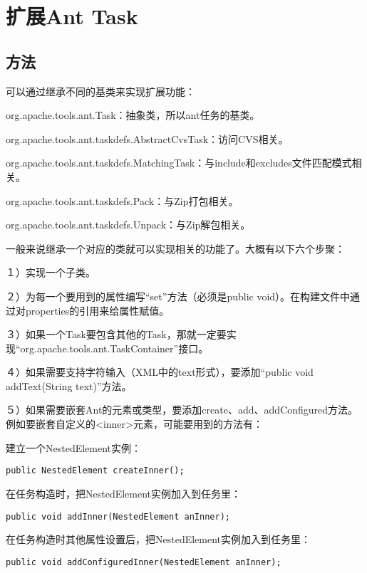 \section{扩展Ant Task}

\subsection{方法}

可以通过继承不同的基类来实现扩展功能：

org.apache.tools.ant.Task：抽象类，所以ant任务的基类。

org.apache.tools.ant.taskdefs.AbstractCvsTask：访问CVS相关。

org.apache.tools.ant.taskdefs.MatchingTask：与include和excludes文件匹配模式相关。

org.apache.tools.ant.taskdefs.Pack：与Zip打包相关。

org.apache.tools.ant.taskdefs.Unpack：与Zip解包相关。

一般来说继承一个对应的类就可以实现相关的功能了。大概有以下六个步聚：

１）实现一个子类。

２）为每一个要用到的属性编写“set”方法（必须是public void）。在构建文件中通过对properties的引用来给属性赋值。

３）如果一个Task要包含其他的Task，那就一定要实现“org.apache.tools.ant.TaskContainer”接口。

４）如果需要支持字符输入（XML中的text形式），要添加“public void addText(String text)”方法。

５）如果需要嵌套Ant的元素或类型，要添加create、add、addConfigured方法。例如要嵌套自定义的<inner>元素，可能要用到的方法有：

建立一个NestedElement实例：

\begin{verbatim}
public NestedElement createInner();
\end{verbatim}

在任务构造时，把NestedElement实例加入到任务里：

\begin{verbatim}
public void addInner(NestedElement anInner);
\end{verbatim}

在任务构造时其他属性设置后，把NestedElement实例加入到任务里：

\begin{verbatim}
public void addConfiguredInner(NestedElement anInner);
\end{verbatim}

